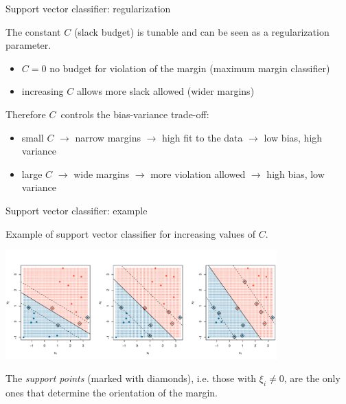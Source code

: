 \documentclass[notes]{beamer}          %
\begin{document}
\begin{frame}{Support vector classifier: regularization}

The constant $C$ (slack budget) is tunable and can be seen as a regularization parameter.

\begin{itemize}
    \item $C = 0$ no budget for violation of the margin (maximum margin classifier)
    \item increasing $C$ allows more slack allowed (wider margins)
\end{itemize}

Therefore $C$\ controls the bias-variance trade-off:

\begin{itemize}
    \item small $C$ $\rightarrow$ narrow margins $\rightarrow$ high fit to the data $\rightarrow$ low bias, high variance
    \item large $C$ $\rightarrow$ wide margins $\rightarrow$ more violation allowed $\rightarrow$ high bias, low variance
\end{itemize}

\end{frame}

\begin{frame}{Support vector classifier: example}

Example of support vector classifier for increasing values of $C$.

\begin{center}
\includegraphics[height=4.2cm]{figures/week_6/svm_support_vector_classifier_regularization_C.pdf}  
\end{center}

The \textit{support points} (marked with diamonds), i.e. those with $\xi_i \neq 0$, are the only ones that determine the orientation of the margin.

\end{frame}
\end{document}
